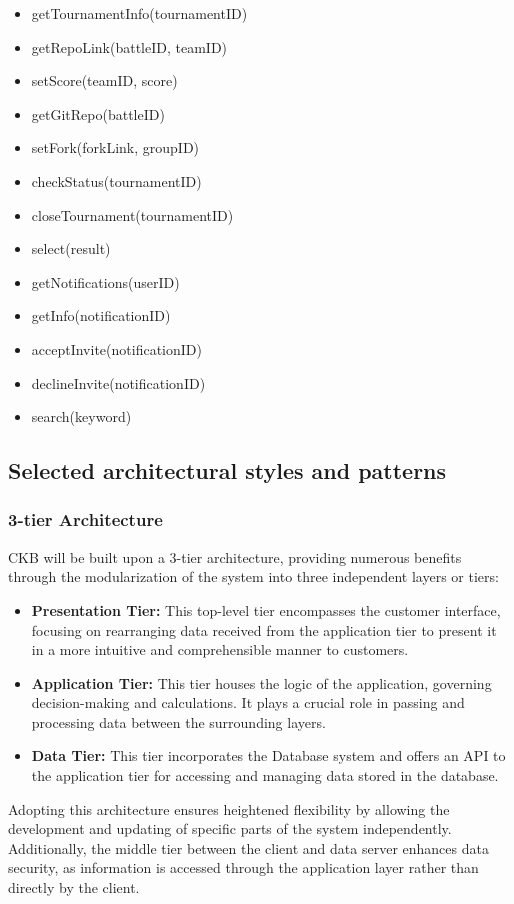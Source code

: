 \documentclass{article}
\begin{document}
\begin{itemize}
\begin{itemize}
            \item getTournamentInfo(tournamentID)
            \item getRepoLink(battleID, teamID)
            \item setScore(teamID, score)
            \item getGitRepo(battleID)
            \item setFork(forkLink, groupID)
            \item checkStatus(tournamentID)
            \item closeTournament(tournamentID)
            \item select(result)
            \item getNotifications(userID)
            \item getInfo(notificationID)
            \item acceptInvite(notificationID)
            \item declineInvite(notificationID)
            \item search(keyword)
        \end{itemize}
\end{itemize}
\newpage
\subsection{Selected architectural styles and patterns}
\subsubsection{3-tier Architecture}
CKB will be built upon a 3-tier architecture, providing numerous benefits through the modularization of the system into three independent layers or tiers:
\begin{itemize}
    \item \textbf{Presentation Tier:} This top-level tier encompasses the customer interface, focusing on rearranging data received from the application tier to present it in a more intuitive and comprehensible manner to customers.
    \item \textbf{Application Tier:} This tier houses the logic of the application, governing decision-making and calculations. It plays a crucial role in passing and processing data between the surrounding layers.
    \item \textbf{Data Tier:} This tier incorporates the Database system and offers an API to the application tier for accessing and managing data stored in the database.
\end{itemize}
Adopting this architecture ensures heightened flexibility by allowing the development and updating of specific parts of the system independently. Additionally, the middle tier between the client and data server enhances data security, as information is accessed through the application layer rather than directly by the client.
\end{document}
